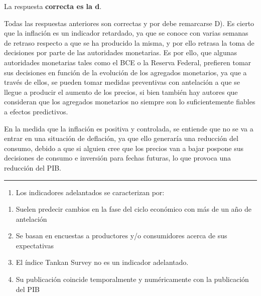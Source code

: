 \documentclass[
  letterpaper,
  DIV=11,
  numbers=noendperiod]{scrreprt}
\providecommand{\tightlist}{%
  \setlength{\itemsep}{0pt}\setlength{\parskip}{0pt}}\usepackage{longtable,booktabs,array}
\begin{document}
\begin{tcolorbox}[enhanced jigsaw, left=2mm, opacityback=0, colback=white, breakable, arc=.35mm, bottomrule=.15mm, rightrule=.15mm, toprule=.15mm, leftrule=.75mm, colframe=quarto-callout-tip-color-frame]
\begin{minipage}[t]{5.5mm}
\textcolor{quarto-callout-tip-color}{\faLightbulb}
\end{minipage}%
\begin{minipage}[t]{\textwidth - 5.5mm}

La respuesta \textbf{correcta es la d}.

Todas las respuestas anteriores son correctas y por debe remarcarse D).
Es cierto que la inflación es un indicador retardado, ya que se conoce
con varias semanas de retraso respecto a que se ha producido la misma, y
por ello retrasa la toma de decisiones por parte de las autoridades
monetarias. Es por ello, que algunas autoridades monetarias tales como
el BCE o la Reserva Federal, prefieren tomar sus decisiones en función
de la evolución de los agregados monetarios, ya que a través de ellos,
se pueden tomar medidas preventivas con antelación a que se llegue a
producir el aumento de los precios, si bien también hay autores que
consideran que los agregados monetarios no siempre son lo
suficientemente fiables a efectos predictivos.

En la medida que la inflación es positiva y controlada, se entiende que
no se va a entrar en una situación de deflación, ya que ello generaría
una reducción del consumo, debido a que si alguien cree que los precios
van a bajar pospone sus decisiones de consumo e inversión para fechas
futuras, lo que provoca una reducción del PIB.

\end{minipage}%
\end{tcolorbox}

\begin{center}\rule{0.5\linewidth}{0.5pt}\end{center}

\begin{enumerate}
\def\labelenumi{\arabic{enumi}.}
\setcounter{enumi}{23}
\tightlist
\item
  Los indicadores adelantados se caracterizan por:
\end{enumerate}

\begin{enumerate}
\def\labelenumi{\alph{enumi})}
\item
  Suelen predecir cambios en la fase del ciclo económico con más de un
  año de antelación
\item
  Se basan en encuestas a productores y/o consumidores acerca de sus
  expectativas
\item
  El índice Tankan Survey no es un indicador adelantado.
\item
  Su publicación coincide temporalmente y numéricamente con la
  publicación del PIB
\end{enumerate}
\end{document}
